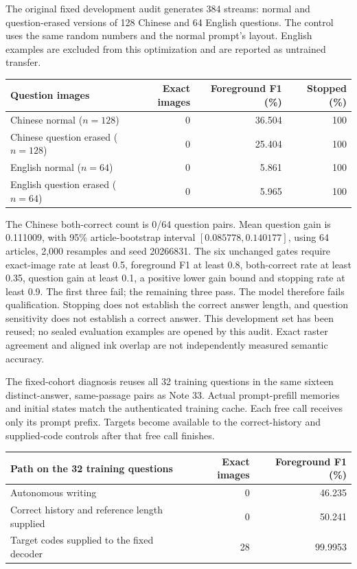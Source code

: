 \documentclass[10pt,a4paper]{article}
\begin{document}
The original fixed development audit generates 384 streams: normal and
question-erased versions of 128 Chinese and 64 English questions. The control
uses the same random numbers and the normal prompt's layout. English examples
are excluded from this optimization and are reported as untrained transfer.

\begin{center}\small
\begin{tabular}{lrrr}
\toprule
Question images & Exact images & Foreground F1 (\%) & Stopped (\%)\\
\midrule
Chinese normal ($n=128$) & 0 & 36.504 & 100\\
Chinese question erased ($n=128$) & 0 & 25.404 & 100\\
English normal ($n=64$) & 0 & 5.861 & 100\\
English question erased ($n=64$) & 0 & 5.965 & 100\\
\bottomrule
\end{tabular}
\end{center}

The Chinese both-correct count is 0/64 question pairs. Mean question gain is
0.111009, with 95\% article-bootstrap interval $[0.085778,0.140177]$, using
64 articles, 2,000 resamples and seed 20266831. The six unchanged gates require
exact-image rate at least 0.5, foreground F1 at least 0.8, both-correct rate
at least 0.35, question gain at least 0.1, a positive lower gain bound and
stopping rate at least 0.9. The first three fail; the remaining three pass.
The model therefore fails qualification. Stopping does not establish the
correct answer length, and question sensitivity does not establish a correct
answer. This development set has been reused; no sealed evaluation examples
are opened by this audit. Exact raster agreement and aligned ink overlap
are not independently measured semantic accuracy.

The fixed-cohort diagnosis reuses all 32 training questions in the same
sixteen distinct-answer, same-passage pairs as Note 33. Actual prompt-prefill
memories and initial states match the authenticated training cache. Each free
call receives only its prompt prefix. Targets become available to the
correct-history and supplied-code controls after that free call finishes.

\begin{center}\small
\begin{tabular}{lrr}
\toprule
Path on the 32 training questions & Exact images & Foreground F1 (\%)\\
\midrule
Autonomous writing & 0 & 46.235\\
Correct history and reference length supplied & 0 & 50.241\\
Target codes supplied to the fixed decoder & 28 & 99.9953\\
\bottomrule
\end{tabular}
\end{center}
\end{document}
